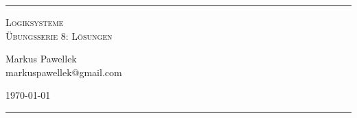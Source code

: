 \documentclass[9pt,fleqn,twoside,a4paper]{article}
\begin{document}
  \pagestyle{mainstyle}
  \thispagestyle{titlestyle}
  \hrule
  \begin{center}
    \huge
    \scshape
    Logiksysteme \\ Übungsserie 8: Lösungen
  \end{center}
  \medskip
  \footnotesize
  \begin{minipage}[c]{0.49\textwidth}
    Markus Pawellek \\
    markuspawellek@gmail.com
  \end{minipage}
  \hfill
  \begin{minipage}[c]{0.49\textwidth}
    \raggedleft
    \today
  \end{minipage}
  \medskip
  \normalsize
  \hrule
  \bigskip

  \begin{multicols}{2}


\end{multicols}
\end{document}
